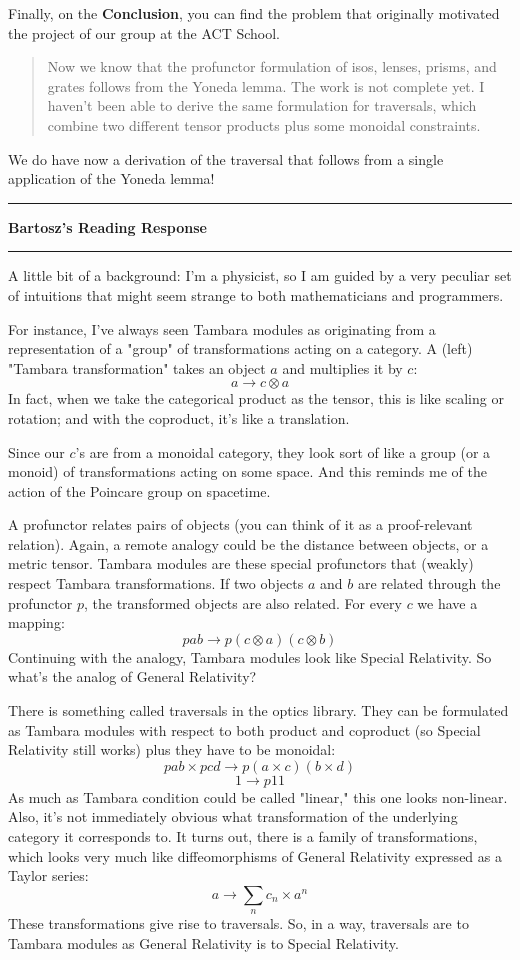 \documentclass{amsart}
\newcommand{\iam}[1]{
  \vspace{0.25em}
  \hrule
  \vspace{0.25em}
  \textbf{{#1}'s Reading Response}
  \vspace{0.25em}
  \hrule
  \vspace{1em}
}
\begin{document}
Finally, on the \textbf{Conclusion}, you can find the problem that originally
motivated the project of our group at the ACT School.

\begin{quote}
  Now we know that the profunctor formulation of isos,
  lenses, prisms, and grates follows from the Yoneda lemma. The work
  is not complete yet. I haven’t been able to derive the same
  formulation for traversals, which combine two different tensor
  products plus some monoidal constraints.
\end{quote}

We do have now a derivation of the traversal that follows from a single application
of the Yoneda lemma!

\iam{Bartosz}

A little bit of a background: I'm a physicist, so I am guided by a very peculiar set of intuitions that might seem strange to both mathematicians and programmers.

For instance, I've always seen Tambara modules as originating from a representation of a "group" of transformations acting on a category. A (left) "Tambara transformation" takes an object $a$ and multiplies it by $c$:
\[a \to c \otimes a\]
In fact, when we take the categorical product as the tensor, this is like scaling or rotation; and with the coproduct, it's like a translation.

Since our $c$'s are from a monoidal category, they look sort of like a group (or a monoid) of transformations acting on some space. And this reminds me of the action of the Poincare group on spacetime.

A profunctor relates pairs of objects (you can think of it as a proof-relevant relation). Again, a remote analogy could be the distance between objects, or a metric tensor. Tambara modules are these special profunctors that (weakly) respect Tambara transformations. If two objects $a$ and $b$ are related through the profunctor $p$, the transformed objects are also related. For every $c$ we have a mapping:
\[p a b \to p (c \otimes a) (c \otimes b)\]
Continuing with the analogy, Tambara modules look like Special Relativity. So what's the analog of General Relativity?

There is something called traversals in the optics library. They can be formulated as Tambara modules with respect to both product and coproduct (so Special Relativity still works) plus they have to be monoidal:
\[p a b \times p c d \to p (a \times c) (b \times d)\]
\[1 \to p 1 1\]
As much as Tambara condition could be called "linear," this one looks non-linear. Also, it's not immediately obvious what transformation of the underlying category it corresponds to. It turns out, there is a family of transformations, which looks very much like diffeomorphisms of General Relativity expressed as a Taylor series:
\[a \to \sum_n c_n \times a^n\]
These transformations give rise to traversals. So, in a way, traversals are to Tambara modules as General Relativity is to Special Relativity.
\end{document}
